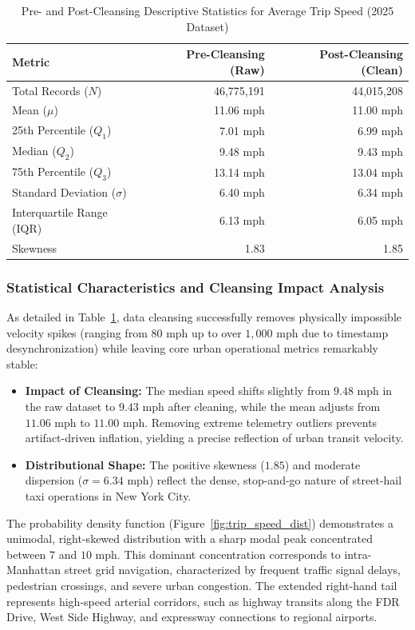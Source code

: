\documentclass[11pt,a4paper]{article}
\begin{document}
\begin{table}[htbp]
\centering
\caption{Pre- and Post-Cleansing Descriptive Statistics for Average Trip Speed (2025 Dataset)}
\label{tab:stats_trip_speed_comparison}
\small
\begin{tabular}{lrr}
\toprule
\textbf{Metric} & \textbf{Pre-Cleansing (Raw)} & \textbf{Post-Cleansing (Clean)} \\
\midrule
Total Records ($N$) & 46,775,191 & 44,015,208 \\
Mean ($\mu$) & 11.06 mph & 11.00 mph \\
25th Percentile ($Q_1$) & 7.01 mph & 6.99 mph \\
Median ($Q_2$) & 9.48 mph & 9.43 mph \\
75th Percentile ($Q_3$) & 13.14 mph & 13.04 mph \\
Standard Deviation ($\sigma$) & 6.40 mph & 6.34 mph \\
Interquartile Range (IQR) & 6.13 mph & 6.05 mph \\
Skewness & 1.83 & 1.85 \\
\bottomrule
\end{tabular}
\end{table}

\subsubsection{Statistical Characteristics and Cleansing Impact Analysis}
As detailed in Table~\ref{tab:stats_trip_speed_comparison}, data cleansing successfully removes physically impossible velocity spikes (ranging from $80$ mph up to over $1,000$ mph due to timestamp desynchronization) while leaving core urban operational metrics remarkably stable:
\begin{itemize}
    \item \textbf{Impact of Cleansing:} The median speed shifts slightly from $9.48$ mph in the raw dataset to $9.43$ mph after cleaning, while the mean adjusts from $11.06$ mph to $11.00$ mph. Removing extreme telemetry outliers prevents artifact-driven inflation, yielding a precise reflection of urban transit velocity.
    \item \textbf{Distributional Shape:} The positive skewness ($1.85$) and moderate dispersion ($\sigma = 6.34$ mph) reflect the dense, stop-and-go nature of street-hail taxi operations in New York City.
\end{itemize}

The probability density function (Figure~\ref{fig:trip_speed_dist}) demonstrates a unimodal, right-skewed distribution with a sharp modal peak concentrated between $7$ and $10$ mph. This dominant concentration corresponds to intra-Manhattan street grid navigation, characterized by frequent traffic signal delays, pedestrian crossings, and severe urban congestion. The extended right-hand tail represents high-speed arterial corridors, such as highway transits along the FDR Drive, West Side Highway, and expressway connections to regional airports.
\end{document}
